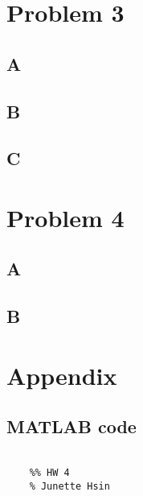 \documentclass[conf]{new-aiaa}
\begin{document}

\section*{Problem 3}

\subsection*{A}



\subsection*{B}


\subsection*{C}




\section*{Problem 4}

\subsection*{A}



\subsection*{B}


\section*{Appendix} 

\subsection*{MATLAB code} 

\begin{lstlisting}

    %% HW 4 
    % Junette Hsin 
    

    
	
\end{lstlisting}






% 
\end{document}
